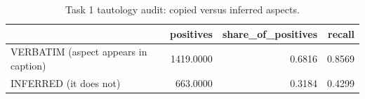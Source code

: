 \begin{table}[t]
\caption{Task 1 tautology audit: copied versus inferred aspects.}
\label{tab:taut}
\begin{tabular}{lrrr}
\toprule
 & positives & share\_of\_positives & recall \\
\midrule
VERBATIM (aspect appears in caption) & 1419.0000 & 0.6816 & 0.8569 \\
INFERRED (it does not) & 663.0000 & 0.3184 & 0.4299 \\
\bottomrule
\end{tabular}
\end{table}
